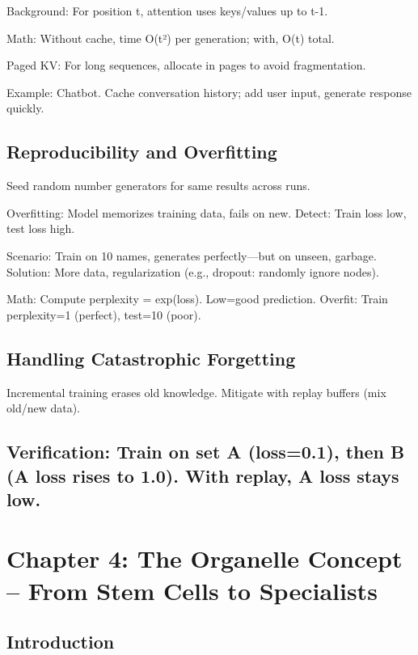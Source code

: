 \documentclass[
]{article}
\begin{document}
Background: For position t, attention uses keys/values up to t-1.

Math: Without cache, time O(t²) per generation; with, O(t) total.

Paged KV: For long sequences, allocate in pages to avoid fragmentation.

Example: Chatbot. Cache conversation history; add user input, generate
response quickly.

\subsection{Reproducibility and
Overfitting}\label{reproducibility-and-overfitting}

Seed random number generators for same results across runs.

Overfitting: Model memorizes training data, fails on new. Detect: Train
loss low, test loss high.

Scenario: Train on 10 names, generates perfectly---but on unseen,
garbage. Solution: More data, regularization (e.g., dropout: randomly
ignore nodes).

Math: Compute perplexity = exp(loss). Low=good prediction. Overfit:
Train perplexity=1 (perfect), test=10 (poor).

\subsection{Handling Catastrophic
Forgetting}\label{handling-catastrophic-forgetting}

Incremental training erases old knowledge. Mitigate with replay buffers
(mix old/new data).

\subsection{Verification: Train on set A (loss=0.1), then B (A loss
rises to 1.0). With replay, A loss stays
low.}\label{verification-train-on-set-a-loss0.1-then-b-a-loss-rises-to-1.0.-with-replay-a-loss-stays-low.}

\section{Chapter 4: The Organelle Concept -- From Stem Cells to
Specialists}\label{chapter-4-the-organelle-concept-from-stem-cells-to-specialists}

\subsection{Introduction}\label{introduction-3}
\end{document}
